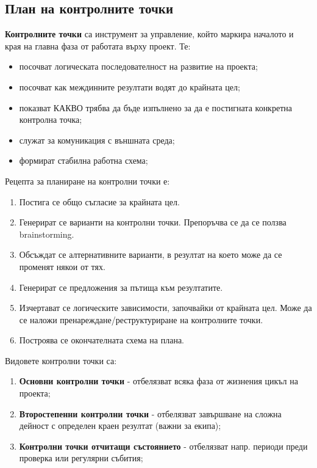 \documentclass[fleqn,12pt]{article}
\begin{document}
\subsection{План на контролните точки}

\textbf{Контролните точки} са инструмент за управление, който маркира началото и края на главна фаза от работата върху проект.
Те:
\begin{itemize}
    \item посочват логическата последователност на развитие на проекта;
    \item посочват как междинните резултати водят до крайната цел;
    \item показват КАКВО трябва да бъде изпълнено за да е постигната конкретна контролна точка;
    \item служат за комуникация с външната среда;
    \item формират стабилна работна схема;
\end{itemize}

Рецепта за планиране на контролни точки е:
\begin{enumerate}
    \item Постига се общо съгласие за крайната цел.
    \item Генерират се варианти на контролни точки. Препоръчва се да се ползва brainstorming.
    \item Обсъждат се алтернативните варианти, в резултат на което може да се променят някои от тях.
    \item Генерират се предложения за пътища към резултатите.
    \item Изчертават се логическите зависимости, започвайки от крайната цел. Може да се наложи пренареждане/реструктуриране на контролните точки.
    \item Построява се окончателната схема на плана.
\end{enumerate}

Видовете контролни точки са:
\begin{enumerate}
    \item \textbf{Основни контролни точки} - отбелязват всяка фаза от жизнения цикъл на проекта;
    \item \textbf{Второстепенни контролни точки} - отбелязват завършване на сложна дейност с определен краен резултат (важни за екипа);
    \item \textbf{Контролни точки отчитащи състоянието} - отбелязват напр. периоди преди проверка или регулярни събития;
\end{enumerate}
\end{document}
